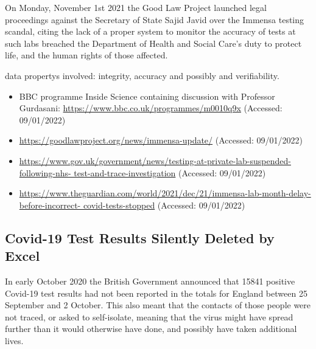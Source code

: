 On Monday, November 1st 2021 the Good Law Project launched legal proceedings against the Secretary of State Sajid Javid over the Immensa testing scandal,
citing the lack of a proper system to monitor the \gls{accuracy} of tests at such labs breached the Department of Health and Social Care's duty to protect life, and the human rights of those affected.

\Glspl{data property} involved: \gls{integrity}, \gls{accuracy} and possibly  and \gls{verifiability}.

\begin{itemize}
  \item BBC programme Inside Science containing discussion with Professor Gurdasani: \href{https://www.bbc.co.uk/programmes/m0010q9x}{https://www.bbc.co.uk/programmes/m0010q9x} (Accessed: 09/01/2022)
  \item\href{https://goodlawproject.org/news/immensa-update/}{https://goodlawproject.org/news/immensa-update/} (Accessed: 09/01/2022)
  \item\href{https://www.gov.uk/government/news/testing-at-private-lab-suspended-following-nhs-test-and-trace-investigation}{https://www.gov.uk/government/news/testing-at-private-lab-suspended-following-nhs- test-and-trace-investigation} (Accessed: 09/01/2022)
  \item\href{https://www.theguardian.com/world/2021/dec/21/immensa-lab-month-delay-before-incorrect-covid-tests-stopped}{https://www.theguardian.com/world/2021/dec/21/immensa-lab-month-delay-before-incorrect- covid-tests-stopped} (Accessed: 09/01/2022)
\end{itemize}

\subsection{Covid-19 Test Results Silently Deleted by Excel} \label{bkm:incacc:covidexcel}

In early October 2020 the British Government announced that 15841 positive Covid-19 test results had not been reported in the totals for England between 25 September and 2 October. This also meant that the contacts of those people were not traced, or asked to self-isolate, meaning that the virus might have spread further than it would otherwise have done, and possibly have taken additional lives.

